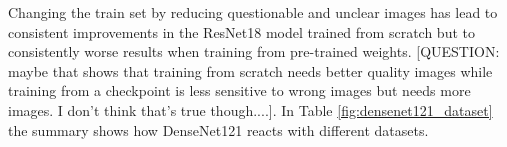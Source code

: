 \begin{table}[h] \centering
{}
\caption{Dataset variations with ResNet18. The first group shows how the datasets performed when trained from scratch whereas the second group shows how the datasets performed with pre-training.}
\label{tbl:resnet18_dataset}
\end{table}

Changing the train set by reducing questionable and unclear images has lead to consistent improvements in the ResNet18 model trained from scratch but to consistently worse results when training from pre-trained weights. [QUESTION: maybe that shows that training from scratch needs better quality images while training from a checkpoint is less sensitive to wrong images but needs more images. I don't think that's true though....]. In Table \ref{fig:densenet121_dataset} the summary shows how DenseNet121 reacts with different datasets.

